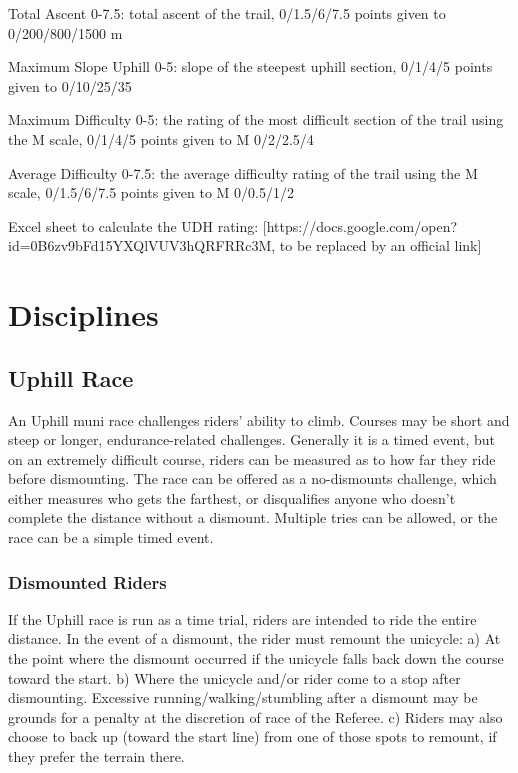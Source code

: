 Total Ascent 0-7.5: total ascent of the trail, 0/1.5/6/7.5 points given to 0/200/800/1500 m

Maximum Slope Uphill 0-5: slope of the steepest uphill section, 0/1/4/5 points given to 0/10/25/35%

Maximum Difficulty 0-5: the rating of the most difficult section of the trail using the M scale, 0/1/4/5 points given to M 0/2/2.5/4

Average Difficulty 0-7.5: the average difficulty rating of the trail using the M scale, 0/1.5/6/7.5 points given to M 0/0.5/1/2

Excel sheet to calculate the UDH rating: [https://docs.google.com/open?id=0B6zv9bFd15YXQlVUV3hQRFRRc3M, to be replaced by an official link]


\section{Disciplines}

\subsection{Uphill Race}
An Uphill muni race challenges riders' ability to climb. Courses may be short
and steep or longer, endurance-related challenges. Generally it is a timed
event, but on an extremely difficult course, riders can be measured as to how
far they ride before dismounting. The race can be offered as a no-dismounts
challenge, which either measures who gets the farthest, or disqualifies anyone
who doesn't complete the distance without a dismount. Multiple tries can be
allowed, or the race can be a simple timed event.

\subsubsection{Dismounted Riders}
If the Uphill race is run as a time trial, riders are intended to ride the
entire distance. In the event of a dismount, the rider must remount the
unicycle: 
a) At the point where the dismount occurred if the unicycle falls back
down the course toward the start. 
b) Where the unicycle and/or rider come to a
stop after dismounting. Excessive running/walking/stumbling after a dismount may
be grounds for a penalty at the discretion of race of the Referee. 
c) Riders may
also choose to back up (toward the start line) from one of those spots to
remount, if they prefer the terrain there.

